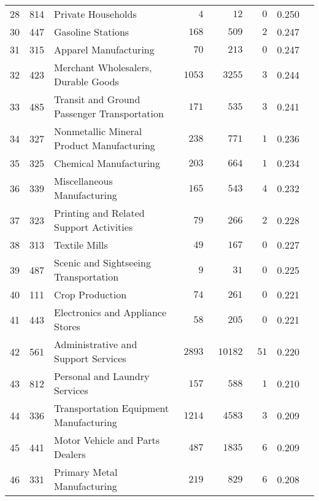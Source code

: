 \documentclass[9pt, oneside]{article}   	%
\begin{document}
\begin{longtable}{lcp{3 in}ccccc}
28  & 814 & Private Households & $\phantom{0000}4$ & $\phantom{0000}12$ & $\phantom{00}0$ & 0.250 \\
30  & 447 & Gasoline Stations & $\phantom{00}168$ & $\phantom{000}509$ & $\phantom{00}2$ & 0.247 \\
31  & 315 & Apparel Manufacturing & $\phantom{000}70$ & $\phantom{000}213$ & $\phantom{00}0$ & 0.247 \\
32  & 423 & Merchant Wholesalers, Durable Goods & $\phantom{0}1053$ & $\phantom{00}3255$ & $\phantom{00}3$ & 0.244 \\
33  & 485 & Transit and Ground Passenger Transportation & $\phantom{00}171$ & $\phantom{000}535$ & $\phantom{00}3$ & 0.241 \\
34  & 327 & Nonmetallic Mineral Product Manufacturing & $\phantom{00}238$ & $\phantom{000}771$ & $\phantom{00}1$ & 0.236 \\
35  & 325 & Chemical Manufacturing & $\phantom{00}203$ & $\phantom{000}664$ & $\phantom{00}1$ & 0.234 \\
36  & 339 & Miscellaneous Manufacturing & $\phantom{00}165$ & $\phantom{000}543$ & $\phantom{00}4$ & 0.232 \\
37  & 323 & Printing and Related Support Activities & $\phantom{000}79$ & $\phantom{000}266$ & $\phantom{00}2$ & 0.228 \\
38  & 313 & Textile Mills & $\phantom{000}49$ & $\phantom{000}167$ & $\phantom{00}0$ & 0.227 \\
39  & 487 & Scenic and Sightseeing Transportation & $\phantom{0000}9$ & $\phantom{0000}31$ & $\phantom{00}0$ & 0.225 \\
40  & 111 & Crop Production & $\phantom{000}74$ & $\phantom{000}261$ & $\phantom{00}0$ & 0.221 \\
41  & 443 & Electronics and Appliance Stores & $\phantom{000}58$ & $\phantom{000}205$ & $\phantom{00}0$ & 0.221 \\
42  & 561 & Administrative and Support Services & $\phantom{0}2893$ & $\phantom{0}10182$ & $\phantom{0}51$ & 0.220 \\
43  & 812 & Personal and Laundry Services & $\phantom{00}157$ & $\phantom{000}588$ & $\phantom{00}1$ & 0.210 \\
44  & 336 & Transportation Equipment Manufacturing & $\phantom{0}1214$ & $\phantom{00}4583$ & $\phantom{00}3$ & 0.209 \\
45  & 441 & Motor Vehicle and Parts Dealers & $\phantom{00}487$ & $\phantom{00}1835$ & $\phantom{00}6$ & 0.209 \\
46  & 331 & Primary Metal Manufacturing & $\phantom{00}219$ & $\phantom{000}829$ & $\phantom{00}6$ & 0.208 \\

\end{longtable}
\end{document}
